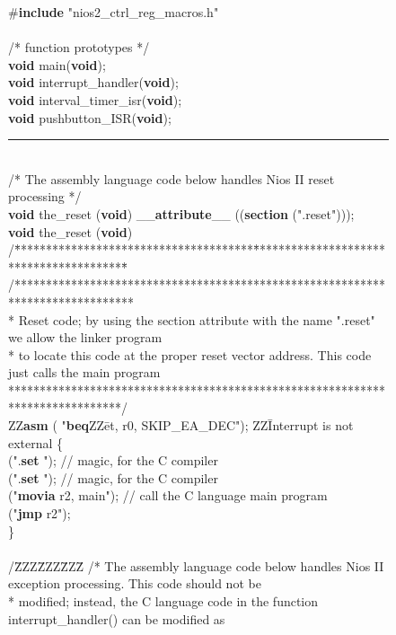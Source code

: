 \begin{figure}[h!]
\begin{center}
\begin{minipage}[t]{12.5 cm}
\begin{tabbing}
\#{\bf include} "nios2\_ctrl\_reg\_macros.h"\\
\\
/* function prototypes */\\
{\bf void} main({\bf void});\\
{\bf void} interrupt\_handler({\bf void});\\
{\bf void} interval\_timer\_isr({\bf void});\\
{\bf void} pushbutton\_ISR({\bf void});\\
\rule{6.0in}{0in}~\\
/* The assembly language code below handles Nios II reset processing */\\
{\bf void} the\_reset ({\bf void}) \_\_{\bf attribute}\_\_ (({\bf section} (".reset")));\\
{\bf void} the\_reset ({\bf void})\\
/\=**************************************\=****************************************\=\kill
/*******************************************************************************\\
\>* Reset code; by using the section attribute with the name ".reset" we allow the linker program\>\>\\
\>* to locate this code at the proper reset vector address. This code just calls the main program\>\>\\
\>******************************************************************************/\\
ZZ\={\bf asm} ( "{\bf beq}ZZ\=et, r0, SKIP\_EA\_DEC"); ZZ\= Interrupt is not external\kill 
\{\\
 (".{\bf set} "); \>// magic, for the C compiler\\
 (".{\bf set} "); \>// magic, for the C compiler\\
 ("{\bf movia} \>r2, main"); \>// call the C language main program\\
 ("{\bf jmp}	\>r2"); \\
\}\\\\
/\=ZZZ\=ZZZ\=ZZZ\=\kill
/* The assembly language code below handles Nios II exception processing. This code should not be\\
\>*  modified; instead, the C language code in the function interrupt\_handler() can be modified as \\

\end{tabbing}
\end{minipage}
\end{center}
\end{figure}
